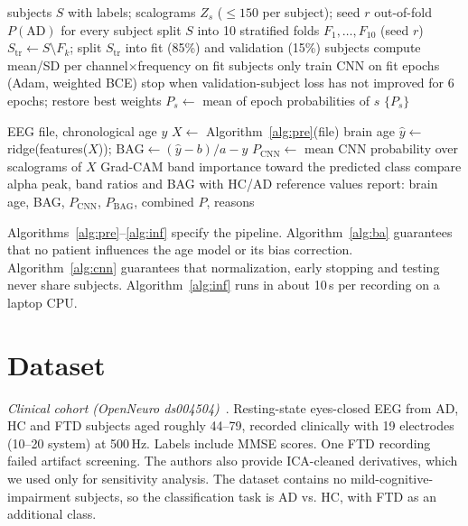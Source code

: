 \documentclass[conference]{IEEEtran}
\begin{document}
\begin{algorithm}[t]
\caption{Subject-level cross-validation of the CNN}
\label{alg:cnn}
\begin{algorithmic}[1]
\Require subjects $S$ with labels; scalograms $Z_s$ ($\le150$ per subject); seed $r$
\Ensure out-of-fold $P(\mathrm{AD})$ for every subject
\State split $S$ into 10 stratified folds $F_1,\dots,F_{10}$ (seed $r$)
  \State $S_\mathrm{tr} \gets S \setminus F_k$; split $S_\mathrm{tr}$ into fit (85\%) and validation (15\%) subjects
  \State compute mean/SD per channel$\times$frequency on fit subjects only
  \State train CNN on fit epochs (Adam, weighted BCE)
  \State stop when validation-subject loss has not improved for 6 epochs; restore best weights
   \State $P_s \gets$ mean of epoch probabilities of $s$ \EndFor
\EndFor
\State \Return $\{P_s\}$ 
\end{algorithmic}
\end{algorithm}

\begin{algorithm}[t]
\caption{Inference for a new subject}
\label{alg:inf}
\begin{algorithmic}[1]
\Require EEG file, chronological age $y$
\State $X \gets$ Algorithm~\ref{alg:pre}(file)
\State brain age $\hat{y} \gets$ ridge(features($X$)); $\mathrm{BAG} \gets (\hat{y}-b)/a - y$
\State $P_\mathrm{CNN} \gets$ mean CNN probability over scalograms of $X$
\State Grad-CAM band importance toward the predicted class
\State compare alpha peak, band ratios and BAG with HC/AD reference values
\State \Return report: brain age, BAG, $P_\mathrm{CNN}$, $P_\mathrm{BAG}$, combined $P$, reasons
\end{algorithmic}
\end{algorithm}

Algorithms~\ref{alg:pre}--\ref{alg:inf} specify the pipeline. Algorithm~\ref{alg:ba} guarantees that no patient influences the age model or its bias correction. Algorithm~\ref{alg:cnn} guarantees that normalization, early stopping and testing never share subjects. Algorithm~\ref{alg:inf} runs in about 10\,s per recording on a laptop CPU.

\section{Dataset}
\emph{Clinical cohort (OpenNeuro ds004504)}~\cite{miltiadous2023}. Resting-state eyes-closed EEG from \nAD{} AD, \nHC{} HC and \nFTD{} FTD subjects aged roughly 44--79, recorded clinically with 19 electrodes (10--20 system) at 500\,Hz. Labels include MMSE scores. One FTD recording failed artifact screening. The authors also provide ICA-cleaned derivatives, which we used only for sensitivity analysis. The dataset contains no mild-cognitive-impairment subjects, so the classification task is AD vs. HC, with FTD as an additional class.
\end{document}
